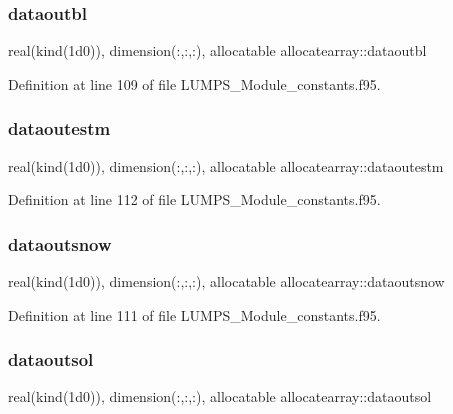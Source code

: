 \subsubsection{\texorpdfstring{dataoutbl}{dataoutbl}}
{\footnotesize\ttfamily real(kind(1d0)), dimension(\+:,\+:,\+:), allocatable allocatearray\+::dataoutbl}



Definition at line 109 of file L\+U\+M\+P\+S\+\_\+\+Module\+\_\+constants.\+f95.

\mbox{\label{namespaceallocatearray_a2eb31590a1528d550321d141efaf4c4b}} 
\subsubsection{\texorpdfstring{dataoutestm}{dataoutestm}}
{\footnotesize\ttfamily real(kind(1d0)), dimension(\+:,\+:,\+:), allocatable allocatearray\+::dataoutestm}



Definition at line 112 of file L\+U\+M\+P\+S\+\_\+\+Module\+\_\+constants.\+f95.

\mbox{\label{namespaceallocatearray_a7e6a4164edb43537d8e21816ee3e33e9}} 
\subsubsection{\texorpdfstring{dataoutsnow}{dataoutsnow}}
{\footnotesize\ttfamily real(kind(1d0)), dimension(\+:,\+:,\+:), allocatable allocatearray\+::dataoutsnow}



Definition at line 111 of file L\+U\+M\+P\+S\+\_\+\+Module\+\_\+constants.\+f95.

\mbox{\label{namespaceallocatearray_a54b22af9df4a501bb6faf47c84186071}} 
\subsubsection{\texorpdfstring{dataoutsol}{dataoutsol}}
{\footnotesize\ttfamily real(kind(1d0)), dimension(\+:,\+:,\+:), allocatable allocatearray\+::dataoutsol}



